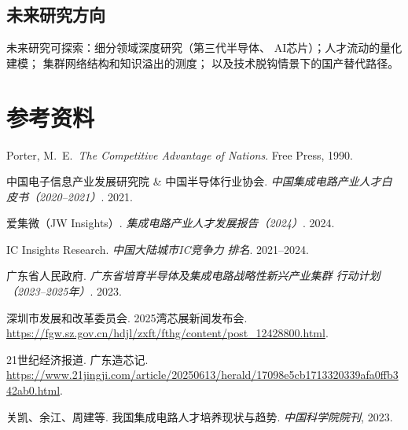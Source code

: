 \documentclass[12pt,a4paper]{article}
\begin{document}
\subsection{未来研究方向}
\label{sec:outlook}

未来研究可探索：细分领域深度研究（第三代半导体、
AI芯片）；人才流动的量化建模；
集群网络结构和知识溢出的测度；
以及技术脱钩情景下的国产替代路径。

\newpage
\section{参考资料}
\label{sec:references}

\begin{enumerate}[label={[\arabic*]}]
    \item Porter, M.\ E.\ \textit{The Competitive Advantage of Nations}.
          Free Press, 1990.
    \item 中国电子信息产业发展研究院 \& 中国半导体行业协会.
          \textit{中国集成电路产业人才白皮书（2020--2021）}. 2021.
    \item 爱集微（JW Insights）. \textit{集成电路产业人才发展报告（2024）}. 2024.
    \item IC Insights Research. \textit{中国大陆城市IC竞争力
          排名}. 2021--2024.
    \item 广东省人民政府.
          \textit{广东省培育半导体及集成电路战略性新兴产业集群
          行动计划（2023--2025年）}. 2023.
    \item 深圳市发展和改革委员会.
          2025湾芯展新闻发布会.
          \url{https://fgw.sz.gov.cn/hdjl/zxft/fthg/content/post_12428800.html}.
    \item 21世纪经济报道. 广东造芯记.
          \url{https://www.21jingji.com/article/20250613/herald/17098e5cb1713320339afa0ffb342ab0.html}.
    \item 关凯、余江、周建等. 我国集成电路人才培养现状与趋势.
          \textit{中国科学院院刊}, 2023.
\end{enumerate}
\end{document}
